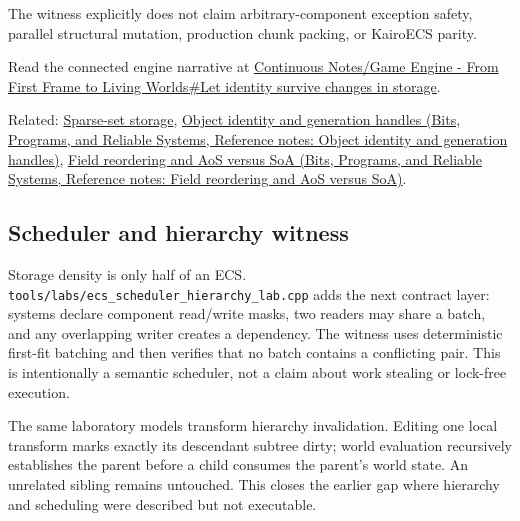 The witness explicitly does not claim arbitrary-component exception safety, parallel structural mutation, production chunk packing, or KairoECS parity.

Read the connected engine narrative at \hyperref[05-engine-i-ch014-let-identity-survive-changes-in-storage]{Continuous Notes/Game Engine - From First Frame to Living Worlds\#Let identity survive changes in storage}.

Related: \hyperref[appendix-8404d0b1a3e7]{Sparse-set storage}, \href{../01-Bits-Programs-and-Reliable-Systems/main.pdf\#nameddest=appendix-f1581457d322}{Object identity and generation handles (Bits, Programs, and Reliable Systems, Reference notes: Object identity and generation handles)}, \href{../01-Bits-Programs-and-Reliable-Systems/main.pdf\#nameddest=appendix-5522ad176ca0}{Field reordering and AoS versus SoA (Bits, Programs, and Reliable Systems, Reference notes: Field reordering and AoS versus SoA)}.

\subsection{Scheduler and hierarchy witness}\label{appendix-fbfeb0430008-scheduler-and-hierarchy-witness}

\hypertarget{appendix-fbfeb0430008-scheduler-and-hierarchy-witness}{}

Storage density is only half of an ECS. \texttt{tools/labs/ecs\_scheduler\_hierarchy\_lab.cpp} adds the next contract layer: systems declare component read/write masks, two readers may share a batch, and any overlapping writer creates a dependency. The witness uses deterministic first-fit batching and then verifies that no batch contains a conflicting pair. This is intentionally a semantic scheduler, not a claim about work stealing or lock-free execution.

The same laboratory models transform hierarchy invalidation. Editing one local transform marks exactly its descendant subtree dirty; world evaluation recursively establishes the parent before a child consumes the parent's world state. An unrelated sibling remains untouched. This closes the earlier gap where hierarchy and scheduling were described but not executable.
